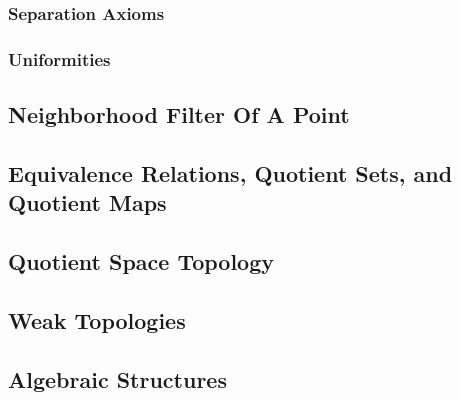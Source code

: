 \subsubsection{Separation Axioms}
\subsubsection{Uniformities}




\subsection{Neighborhood Filter Of A Point}



\subsection{Equivalence Relations, Quotient Sets, and Quotient Maps}

 

 



\subsection{Quotient Space Topology}


\subsection{Weak Topologies}

\subsection{Algebraic Structures}


















